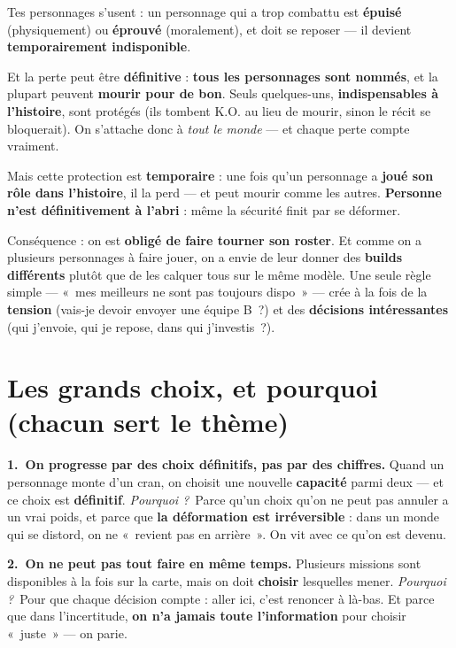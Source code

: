\documentclass[11pt,a4paper]{article}
\newcommand{\pourquoi}{\textit{\textcolor{accent2}{Pourquoi ?}}\ }
\begin{document}
\noindent Tes personnages s'usent : un personnage qui a trop combattu est \textbf{épuisé} (physiquement) ou \textbf{éprouvé} (moralement), et doit se reposer --- il devient \textbf{temporairement indisponible}.

\smallskip
Et la perte peut être \textbf{définitive} : \textbf{tous les personnages sont nommés}, et la plupart peuvent \textbf{mourir pour de bon}. Seuls quelques-uns, \textbf{indispensables à l'histoire}, sont protégés (ils tombent K.O. au lieu de mourir, sinon le récit se bloquerait). On s'attache donc à \emph{tout le monde} --- et chaque perte compte vraiment.

\smallskip
Mais cette protection est \textbf{temporaire} : une fois qu'un personnage a \textbf{joué son rôle dans l'histoire}, il la perd --- et peut mourir comme les autres. \textbf{Personne n'est définitivement à l'abri} : même la sécurité finit par se déformer.

\smallskip
Conséquence : on est \textbf{obligé de faire tourner son roster}. Et comme on a plusieurs personnages à faire jouer, on a envie de leur donner des \textbf{builds différents} plutôt que de les calquer tous sur le même modèle. Une seule règle simple --- «~mes meilleurs ne sont pas toujours dispo~» --- crée à la fois de la \textbf{tension} (vais-je devoir envoyer une équipe B~?) et des \textbf{décisions intéressantes} (qui j'envoie, qui je repose, dans qui j'investis~?).

\section{Les grands choix, et pourquoi (chacun sert le thème)}

\textbf{1.~On progresse par des choix définitifs, pas par des chiffres.}
Quand un personnage monte d'un cran, on choisit une nouvelle \textbf{capacité} parmi deux --- et ce choix est \textbf{définitif}. \pourquoi Parce qu'un choix qu'on ne peut pas annuler a un vrai poids, et parce que \textbf{la déformation est irréversible} : dans un monde qui se distord, on ne «~revient pas en arrière~». On vit avec ce qu'on est devenu.

\smallskip
\textbf{2.~On ne peut pas tout faire en même temps.}
Plusieurs missions sont disponibles à la fois sur la carte, mais on doit \textbf{choisir} lesquelles mener. \pourquoi Pour que chaque décision compte : aller ici, c'est renoncer à là-bas. Et parce que dans l'incertitude, \textbf{on n'a jamais toute l'information} pour choisir «~juste~» --- on parie.
\end{document}

